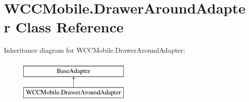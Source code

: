 \hypertarget{class_w_c_c_mobile_1_1_drawer_around_adapter}{}\section{W\+C\+C\+Mobile.\+Drawer\+Around\+Adapter Class Reference}
\label{class_w_c_c_mobile_1_1_drawer_around_adapter}
Inheritance diagram for W\+C\+C\+Mobile.\+Drawer\+Around\+Adapter\+:\begin{figure}[H]
\begin{center}
\leavevmode
\includegraphics[height=2.000000cm]{class_w_c_c_mobile_1_1_drawer_around_adapter}
\end{center}
\end{figure}
